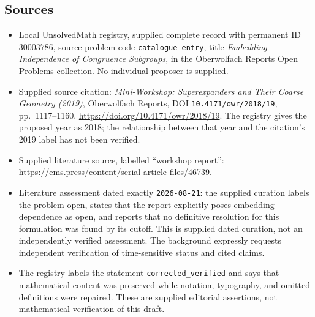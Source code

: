 \documentclass[11pt]{article}
\begin{document}
\subsection{Sources}
\begin{itemize}
\item Local UnsolvedMath registry, supplied complete record with permanent ID \(30003786\), source problem code \texttt{catalogue entry}, title \emph{Embedding Independence of Congruence Subgroups}, in the Oberwolfach Reports Open Problems collection. No individual proposer is supplied.
\item Supplied source citation: \emph{Mini-Workshop: Superexpanders and Their Coarse Geometry (2019)}, Oberwolfach Reports, DOI \texttt{10.4171/owr/2018/19}, pp.~1117--1160. \url{https://doi.org/10.4171/owr/2018/19}. The registry gives the proposed year as 2018; the relationship between that year and the citation's 2019 label has not been verified.
\item Supplied literature source, labelled ``workshop report'': \url{https://ems.press/content/serial-article-files/46739}.
\item Literature assessment dated exactly \texttt{2026-08-21}: the supplied curation labels the problem open, states that the report explicitly poses embedding dependence as open, and reports that no definitive resolution for this formulation was found by its cutoff. This is supplied dated curation, not an independently verified assessment. The background expressly requests independent verification of time-sensitive status and cited claims.
\item The registry labels the statement \texttt{corrected\_verified} and says that mathematical content was preserved while notation, typography, and omitted definitions were repaired. These are supplied editorial assertions, not mathematical verification of this draft.
\end{itemize}
\end{document}

